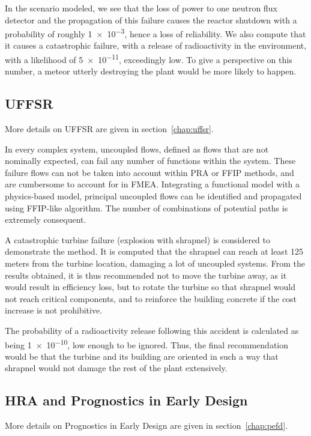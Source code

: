 In the scenario modeled, we see that the loss of power to one neutron flux detector and the propagation of this failure causes the reactor shutdown with a probability of roughly \num{1e-3}, hence a loss of reliability. We also compute that it causes a catastrophic failure, with a release of radioactivity in the environment, with a likelihood of \num{5e-11}, exceedingly low. To give a perspective on this number, a meteor utterly destroying the plant would be more likely to happen.

\subsection{UFFSR}

More details on UFFSR are given in section~\ref{chap:uffsr}.

In every complex system, uncoupled flows, defined as flows that are not nominally expected, can fail any number of functions within the system. These failure flows can not be taken into account within PRA or FFIP methods, and are cumbersome to account for in FMEA. Integrating a functional model with a physics-based model, principal uncoupled flows can be identified and propagated using FFIP-like algorithm. The number of combinations of potential paths is extremely consequent.

A catastrophic turbine failure (explosion with shrapnel) is considered to demonstrate the method. It is computed that the shrapnel can reach at least 125 meters from the turbine location, damaging a lot of uncoupled systems. From the results obtained, it is thus recommended not to move the turbine away, as it would result in efficiency loss, but to rotate the turbine so that shrapnel would not reach critical components, and to reinforce the building concrete if the cost increase is not prohibitive.

The probability of a radioactivity release following this accident is calculated as being \num{1e-10}, low enough to be ignored. Thus, the final recommendation would be that the turbine and its building are oriented in such a way that shrapnel would not damage the rest of the plant extensively.

\subsection{HRA and Prognostics in Early Design}

More details on Prognostics in Early Design are given in section~\ref{chap:pefd}.

